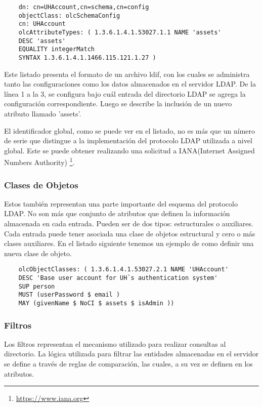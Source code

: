\newpage

\begin{lstlisting}
	dn: cn=UHAccount,cn=schema,cn=config
	objectClass: olcSchemaConfig
	cn: UHAccount
	olcAttributeTypes: ( 1.3.6.1.4.1.53027.1.1 NAME 'assets'
	DESC 'assets'
	EQUALITY integerMatch
	SYNTAX 1.3.6.1.4.1.1466.115.121.1.27 )
\end{lstlisting}

Este listado presenta el formato de un archivo ldif, con los cuales se administra tanto las 
configuraciones como los datos almacenados en el servidor LDAP. De la línea 1 a la 3, 
se configura bajo cuál entrada del directorio LDAP se agrega la configuración correspondiente.
Luego se describe la inclusión de un nuevo atributo llamado 'assets'.

El identificador global, como se puede ver en el listado, no es más que un nímero de serie 
que distingue a la implementación del protocolo LDAP utilizada a nivel global. Este se puede 
obtener realizando una solicitud a IANA(Internet Assigned Numbers Authority)
\footnote{ \url{https://www.iana.org}}.

\subsubsection{Clases de Objetos}
Estos también representan una parte importante del esquema del protocolo LDAP. No son más que 
conjunto de atributos que definen la información almacenada en cada entrada. Pueden ser de 
dos tipos: estructurales o auxiliares. Cada entrada puede tener asociada una clase de 
objetos estructural y cero o más clases auxiliares. En el listado siguiente tenemos un ejemplo
de como definir una nueva clase de objeto.

\begin{lstlisting}
	olcObjectClasses: ( 1.3.6.1.4.1.53027.2.1 NAME 'UHAccount'
	DESC 'Base user account for UH`s authentication system'
	SUP person
	MUST (userPassword $ email )
	MAY (givenName $ NoCI $ assets $ isAdmin ))
\end{lstlisting}

\subsubsection{Filtros}
Los filtros representan el mecanismo utilizado para realizar consultas al directorio. 
La lógica utilizada para filtrar las entidades almacenadas en el servidor se define a través 
de reglas de comparación, las cuales, a su vez se definen en los atributos.

